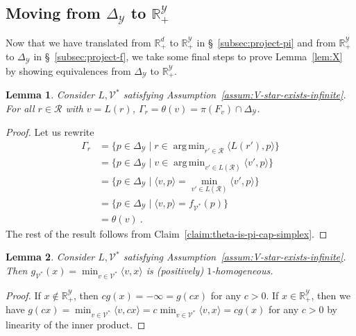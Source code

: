 \documentclass[11pt]{article}
\newcommand{\reals}{\mathbb{R}}
\newcommand{\simplex}{\Delta_\Y}
\newcommand{\R}{\mathcal{R}}
\newcommand{\V}{\mathcal{V}}
\newcommand{\Y}{\mathcal{Y}}
\newcommand{\inprod}[2]{\langle #1, #2 \rangle}%
\DeclareMathOperator*{\argmin}{arg\,min}
\newtheorem{lemma}{Lemma}
\begin{document}
\subsection{Moving from $\simplex$ to $\reals^\Y_+$}
Now that we have translated from $\reals^d_+$ to $\reals^\Y_+$ in \S~\ref{subsec:project-pi} and from $\reals^\Y_+$ to $\simplex$ in \S~\ref{subsec:project-f}, we take some final steps to prove Lemma~\ref{lem:X} by showing equivalences from $\simplex$ to $\reals^\Y_+$.
\begin{lemma}\label{lem:level-set-is-projected-face}
  Consider $L, \V^*$ satisfying Assumption~\ref{assum:V-star-exists-infinite}.
  For all $r \in \R$ with $v = L(r)$, $\Gamma_r = \theta(v) = \pi(F_{v}) \cap \simplex$.
\end{lemma}
\begin{proof}
  Let us rewrite
  \begin{align*}
    \Gamma_r
    &= \{p \in \simplex \mid r \in \argmin_{r' \in \R} \inprod{L(r')}{p}\}\\
    &= \{p \in \simplex \mid v \in \argmin_{v' \in L(\R)} \inprod{v'}{p}\}\\
    &= \{p \in \simplex \mid \inprod{v}{p} = \min_{v' \in L(\R)}\inprod{v'}{p}\}\\
    &= \{p \in \simplex \mid \inprod{v}{p} = f_{\V^*}(p) \}\\
    &= \theta(v)~.
  \end{align*}
  The rest of the result follows from Claim~\ref{claim:theta-is-pi-cap-simplex}.
   
\end{proof}


\begin{lemma}\label{lem:g-1-homog}
	Consider $L, \V^*$ satisfying Assumption~\ref{assum:V-star-exists-infinite}.
	Then $g_{\V^*}(x) = \min_{v \in \V^*}\inprod{v}{x}$ is (positively) $1$-homogeneous.
\end{lemma}
\begin{proof}
	If $x \not \in \reals^\Y_+$, then $c g(x) = -\infty = g(cx)$ for any $c > 0$.
	If $x \in \reals^\Y_+$, then we have $g(cx) = \min_{v \in \V^*}\inprod{v}{cx} = c \min_{v \in \V^*}\inprod{v}{x} = c g(x)$ for any $c > 0$ by linearity of the inner product.
\end{proof}
\end{document}

